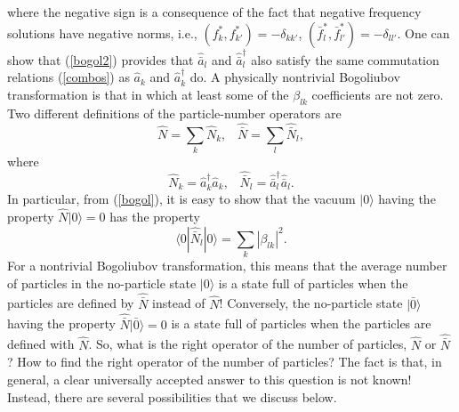 \documentclass[12pt]{article}
\begin{document}
where the negative sign is a consequence of the fact that 
negative frequency solutions have negative norms, i.e., 
$(f_k^*,f_{k'}^*)=-\delta_{kk'}$, 
$(\bar{f}_l^*,\bar{f}_{l'}^*)=-\delta_{ll'}$.
One can show that (\ref{bogol2}) provides that $\hat{\bar{a}}_l$ 
and $\hat{\bar{a}}_l^{\dagger}$ also satisfy the same commutation relations
(\ref{combos}) as $\hat{a}_k$ and $\hat{a}_k^{\dagger}$ do. 
A physically nontrivial Bogoliubov transformation 
is that in which at least some of the $\beta_{lk}$ coefficients 
are not zero. Two different definitions of the particle-number operators 
are
\begin{equation}
\hat{N}=\sum_k \hat{N}_k , \;\;\;
\hat{\bar{N}}=\sum_l \hat{\bar{N}}_l ,
\end{equation}
where
\begin{equation}
\hat{N}_k=\hat{a}_k^{\dagger}\hat{a}_k , \;\;\;
\hat{\bar{N}}_l=\hat{\bar{a}}_l^{\dagger}\hat{\bar{a}}_l .
\end{equation}
In particular, from (\ref{bogol}), it is easy to show that
the vacuum $|0\rangle$ having the property  
$\hat{N}|0\rangle=0$ has the property
\begin{equation}\label{parcreat}
\langle 0|\hat{\bar{N}}_l|0\rangle=\sum_k |\beta_{lk}|^2 .
\end{equation}
For a nontrivial Bogoliubov transformation,
this means that the average number of particles in the
no-particle state $|0\rangle$ is a 
state full of particles when the particles are defined by
$\hat{\bar{N}}$ instead of $\hat{N}$! Conversely, 
the no-particle state $|\bar{0}\rangle$ having the property 
$\hat{\bar{N}}|\bar{0}\rangle=0$ is a state full of particles
when the particles are defined with $\hat{N}$.
So, what is the right operator of the number of particles,
$\hat{N}$ or $\hat{\bar{N}}$? How to find the right 
operator of the number of particles? The fact is that, in general, 
a clear universally accepted answer to this question is not known! 
Instead, there are several possibilities that we discuss below.
\end{document}
